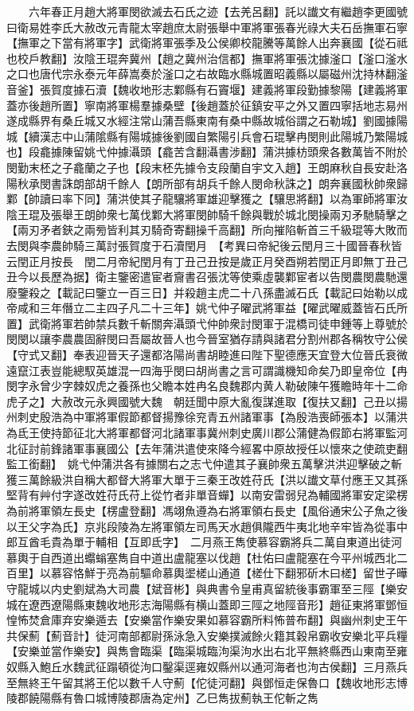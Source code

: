 　　六年春正月趙大將軍閔欲滅去石氏之迹【去羌呂翻】託以䜟文有繼趙李更國號曰衛易姓李氏大赦改元青龍太宰趙庶太尉張舉中軍將軍張春光祿大夫石岳撫軍石寧【撫軍之下當有將軍字】武衛將軍張季及公侯卿校龍騰等萬餘人出奔襄國【從石祗也校戶教翻】汝陰王琨奔冀州【趙之冀州治信都】撫軍將軍張沈據滏口【滏口滏水之口也唐代宗永泰元年薛嵩奏於滏口之右故臨水縣城置昭義縣以屬磁州沈持林翻滏音釜】張賀度據石瀆【魏收地形志鄴縣有石竇堰】建義將軍段勤據黎陽【建義將軍蓋亦後趙所置】寧南將軍楊羣據桑壁【後趙蓋於征鎮安平之外又置四寧括地志易州遂成縣界有桑丘城又水經注常山蒲吾縣東南有桑中縣故城俗謂之石勒城】劉國據陽城【續漢志中山蒲隂縣有陽城據後劉國自繁陽引兵會石琨擊冉閔則此陽城乃繁陽城也】段龕據陳留姚弋仲據灄頭【龕苦含翻灄書涉翻】蒲洪據枋頭衆各數萬皆不附於閔勤末柸之子龕蘭之子也【段末柸先據令支段蘭自宇文入趙】王朗麻秋自長安赴洛陽秋承閔書誅朗部胡千餘人【朗所部有胡兵千餘人閔命秋誅之】朗奔襄國秋帥衆歸鄴【帥讀曰率下同】蒲洪使其子龍驤將軍雄迎擊獲之【驤思將翻】以為軍師將軍汝陰王琨及張舉王朗帥衆七萬伐鄴大將軍閔帥騎千餘與戰於城北閔操兩刃矛馳騎擊之【兩刃矛者鋏之兩㫄皆利其刃騎奇寄翻操千高翻】所向摧陷斬首三千級琨等大敗而去閔與李農帥騎三萬討張賀度于石瀆閏月　【考異曰帝紀後云閏月三十國晉春秋皆云閏正月按長　閏二月帝紀閏月有丁丑己丑按是歲正月癸酉朔若閏正月即無丁丑己丑今以長歷為据】衛主鑒密遣宦者齎書召張沈等使乘虛襲鄴宦者以告閔農閔農馳還廢鑒殺之【載記曰鑒立一百三日】并殺趙主虎二十八孫盡滅石氏【載記曰始勒以成帝咸和三年僭立二主四子凡二十三年】姚弋仲子曜武將軍益【曜武曜威蓋皆石氏所置】武衛將軍若帥禁兵數千斬關奔灄頭弋仲帥衆討閔軍于混橋司徒申鍾等上尊號於閔閔以讓李農農固辭閔曰吾屬故晉人也今晉室猶存請與諸君分割州郡各稱牧守公侯【守式又翻】奉表迎晉天子還都洛陽尚書胡睦進曰陛下聖德應天宜登大位晉氏衰微遠竄江表豈能總馭英雄混一四海乎閔曰胡尚書之言可謂識機知命矣乃即皇帝位【冉閔字永曾少字棘奴虎之養孫也父瞻本姓冉名良魏郡内黄人勒破陳午獲瞻時年十二命虎子之】大赦改元永興國號大魏　朝廷聞中原大亂復謀進取【復扶又翻】己丑以揚州刺史殷浩為中軍將軍假節都督揚豫徐兖青五州諸軍事【為殷浩喪師張本】以蒲洪為氐王使持節征北大將軍都督河北諸軍事冀州刺史廣川郡公蒲健為假節右將軍監河北征討前鋒諸軍事襄國公【去年蒲洪遣使來降今經畧中原故授任以懷來之使疏吏翻監工銜翻】　姚弋仲蒲洪各有據關右之志弋仲遣其子襄帥衆五萬擊洪洪迎擊破之斬獲三萬餘級洪自稱大都督大將軍大單于三秦王改姓苻氏【洪以䜟文草付應王又其孫堅背有艸付字遂改姓苻氏苻上從竹者非單音蟬】以南安雷弱兒為輔國將軍安定梁楞為前將軍領左長史【楞盧登翻】馮翊魚遵為右將軍領右長史【風俗通宋公子魚之後以王父字為氏】京兆段陵為左將軍領左司馬天水趙俱隴西牛夷北地辛牢皆為從事中郎互酋毛貴為單于輔相【互即氐字】　二月燕王雋使慕容霸將兵二萬自東道出徒河慕輿于自西道出蠮螉塞雋自中道出盧龍塞以伐趙【杜佑曰盧龍塞在今平州城西北二百里】以慕容恪鮮于亮為前驅命慕輿埿槎山通道【槎仕下翻邪斫木曰槎】留世子曄守龍城以内史劉斌為大司農【斌音彬】與典書令皇甫真留統後事霸軍至三陘【樂安城在遼西遼陽縣東魏收地形志海陽縣有横山蓋即三陘之地陘音形】趙征東將軍鄧恒惶怖焚倉庫弃安樂遁去【安樂當作樂安果如慕容霸所料怖普布翻】與幽州刺史王午共保薊【薊音計】徒河南部都尉孫泳急入安樂撲滅餘火籍其穀帛霸收安樂北平兵糧【安樂並當作樂安】與雋會臨渠【臨渠城臨泃渠泃水出右北平無終縣西山東南至雍奴縣入鮑丘水魏武征蹋頓從泃口鑿渠逕雍奴縣州以通河海者也泃古侯翻】三月燕兵至無終王午留其將王佗以數千人守薊【佗徒河翻】與鄧恒走保魯口【魏收地形志博陵郡饒陽縣有魯口城博陵郡唐為定州】乙巳雋拔薊執王佗斬之雋